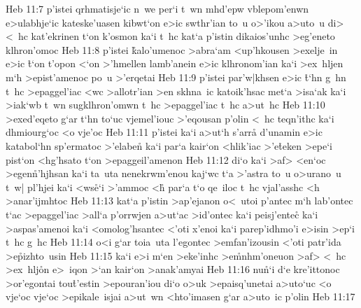 \vs Heb 11:7
p'istei
qrhmatisje`ic
n~we
per`i
t~wn
mhd'epw
vblepom'enwn
e>ulabhje`ic
kateske'uasen
kibwt`on
e>ic
swthr'ian
to~u
o>'ikou
a>uto~u
di>
<~hc
kat'ekrinen
t`on
k'osmon
ka`i
t~hc
kat`a
p'istin
dikaios'unhc
>eg'eneto
klhron'omoc\bibvsend
\vs Heb 11:8
p'istei
\r{k}alo'umenoc
>abra`am
<up'hkousen
>exelje~in
e>ic
\r{t}`on
t'opon
<`on
>'hmellen
lamb'anein
e>ic
klhronom'ian
ka`i
>ex~hljen
m`h
>epist'amenoc
po~u
>'erqetai\bibvsend
\vs Heb 11:9
p'istei
par'w|khsen
e>ic
\r{t}`hn
g~hn
t~hc
>epaggel'iac
<wc
>allotr'ian
>en
skhna~ic
katoik'hsac
met`a
>isa`ak
ka`i
>iak`wb
t~wn
sugklhron'omwn
t~hc
>epaggel'iac
t~hc
a>ut~hc\bibvsend
\vs Heb 11:10
>exed'eqeto
g`ar
t`hn
to`uc
vjemel'iouc
>'eqousan
p'olin
<~hc
teqn'ithc
ka`i
dhmiourg`oc
<o
vje'oc\bibvsend
\vs Heb 11:11
p'istei
ka`i
a>ut`h
s'arr\r{a}
d'unamin
e>ic
katabol`hn
sp'ermatoc
>'elabe\r{n}
ka`i
par`a
kair`on
<hlik'iac
>'e\r{t}eken
>epe`i
pist`on
<hg'hsato
t`on
>epaggeil'amenon\bibvsend
\vs Heb 11:12
di`o
ka`i
>af>
<en`oc
>egen\r{n}'hjhsan
ka`i
ta~uta
nenekrwm'enou
kaj`wc
t`a
>'astra
to~u
o>urano~u
t~w|
pl'hjei
ka`i
<ws\r{e}`i
>'ammoc
<h\r{}
par`a
t`o
qe~iloc
t~hc
vjal'asshc
<h
>anar'ijmhtoc\bibvsend
\vs Heb 11:13
kat`a
p'istin
>ap'ejanon
o<~utoi
p'antec
m`h
lab'ontec
t`ac
>epaggel'iac
>all`a
p'orrwjen
a>ut`ac
>id'ontec
ka`i
peisj'entec\r{}
ka`i
>aspas'amenoi
ka`i
<omolog'hsantec
<'oti
x'enoi
ka`i
parep'idhmo'i
e>isin
>ep`i
t~hc
g~hc\bibvsend
\vs Heb 11:14
o<i
g`ar
toia~uta
l'egontec
>emfan'izousin
<'oti
patr'ida
>e\r{p}izhto~usin\bibvsend
{}
\vs Heb 11:15
ka`i
e>i
m`en
>eke'inhc
>e\r{m}nhm'oneuon
>af>
<~hc
>ex~hlj\r{o}n
e>~iqon
>`an
kair`on
>anak'amyai\bibvsend
\vs Heb 11:16
nu\r{n}`i
d`e
kre'ittonoc
>or'egontai
tou\r{t}'estin
>epouran'iou
di`o
o>uk
>epaisq'unetai
a>uto`uc
<o
vje`oc
vje`oc
>epikale~isjai
a>ut~wn
<hto'imasen
g`ar
a>uto~ic
p'olin\bibvsend
\vs Heb 11:17
